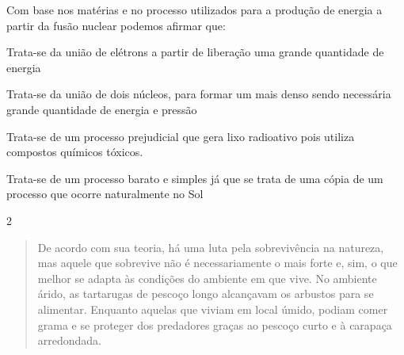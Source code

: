 {{\begin{quote}
\end{quote}

Com base nos matérias e no processo utilizados para a produção de
energia a partir da fusão nuclear podemos afirmar que:

\begin{escolha}
\item
  Trata-se da união de elétrons a partir de liberação uma grande
  quantidade de energia
\item
  Trata-se da união de dois núcleos, para formar um mais denso sendo
  necessária grande quantidade de energia e pressão
\item
  Trata-se de um processo prejudicial que gera lixo radioativo pois
  utiliza compostos químicos tóxicos.
\item
  Trata-se de um processo barato e simples já que se trata de uma cópia
  de um processo que ocorre naturalmente no Sol
\end{escolha}


\num{2}
\begin{quote}
  De acordo com sua teoria, há uma luta pela sobrevivência na
  natureza, mas aquele que sobrevive não é necessariamente o mais forte
  e, sim, o que melhor se adapta às condições do ambiente em que vive.
  No ambiente árido, as tartarugas de pescoço longo alcançavam os
  arbustos para se alimentar. Enquanto aquelas que viviam em local
  úmido, podiam comer grama e se proteger dos predadores graças ao
  pescoço curto e à carapaça arredondada.

\end{quote}

}}
